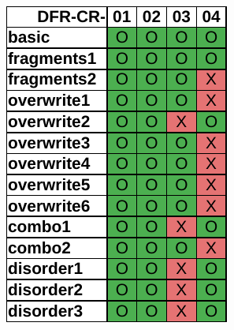\begin{figure}
    \centering

    \begin{subfigure}{0.3\linewidth}
        \includegraphics[width=\linewidth]{fig/autopsy_results_fat.pdf}
    \end{subfigure}~~
    \begin{subfigure}{0.3\linewidth}

\end{subfigure}
\end{figure}
